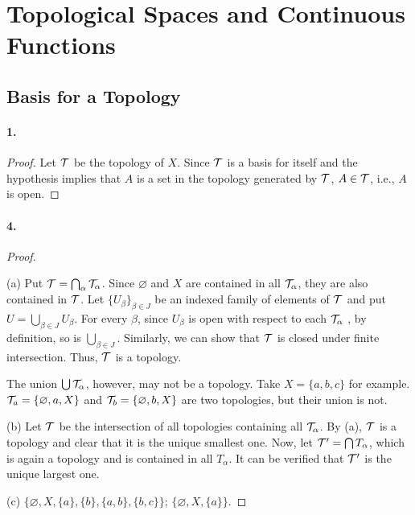 \section{Topological Spaces and Continuous Functions}
\setcounter{subsection}{12}
\subsection{Basis for a Topology}
  \paragraph{1.}
  \begin{proof}
    Let $\mathcal{T}$ be the topology of $X$. Since $\mathcal{T}$ is a basis for itself and the 
    hypothesis implies that $A$ is a set in the topology generated by $\mathcal{T}$, 
    $A\in\mathcal{T}$, i.e., $A$ is open.
  \end{proof}
  
  \paragraph{4.}
  \begin{proof}
    $\,$\par
    (a) Put $\mathcal{T}=\bigcap_\alpha \mathcal{T}_\alpha$. Since $\varnothing$ and $X$ are 
    contained in all $\mathcal{T}_\alpha$, they are also contained in $\mathcal{T}$. Let $\{
    U_\beta\}_{\beta\in J}$ be an indexed family of elements of $\mathcal{T}$ and put
    $U=\bigcup_{\beta\in J}U_\beta$. For every $\beta$, since $U_\beta$ is open
    with respect to each $\mathcal{T}_\alpha$ , by definition, so is $\bigcup_{\beta\in
    J}$. Similarly, we can show that $\mathcal{T}$ is closed under finite intersection.
    Thus, $\mathcal{T}$ is a topology.\par
    The union $\bigcup\mathcal{T}_\alpha$, however, may not be a topology. Take $X=\{a,
    b,c\}$ for example. $\mathcal{T}_a=\{\varnothing, a, X\}$ and $\mathcal{T}_b=\{\varnothing, 
    b, X\}$ are two topologies, but their union is not.\par
    (b) Let $\mathcal{T}$ be the intersection of all topologies containing all $\mathcal{T}
    _\alpha$. By (a), $\mathcal{T}$ is a topology and clear that it is the unique
    smallest one. Now, let $\mathcal{T}^\prime=\bigcap T_\alpha$, which is again a 
    topology and is contained in all $T_\alpha$. It can be verified that $\mathcal{T}
    ^\prime$ is the unique largest one.\par
    (c) $\{\varnothing, X, \{a\}, \{b\}, \{a,b\}, \{b,c\}\}$; $\{\varnothing,
    X, \{a\}\}$.
  \end{proof}
  
